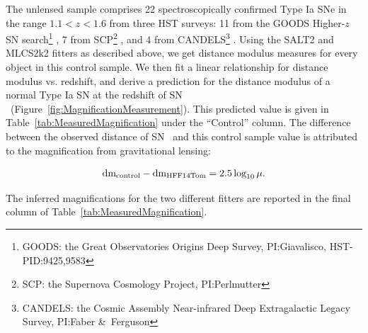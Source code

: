 The unlensed sample comprises 22 spectroscopically confirmed Type Ia
SNe in the range $1.1<z<1.6$ from three HST surveys: 11 from the GOODS Higher-$z$ SN search\footnote{GOODS: the Great Observatories Origins Deep Survey, PI:Giavalisco, HST-PID:9425,9583} \citep{Strolger:2004,Riess:2007}, 7 from SCP\footnote{SCP: the Supernova Cosmology Project, PI:Perlmutter} \citep{Suzuki:2012}, and 4 from CANDELS\footnote{CANDELS: the Cosmic Assembly Near-infrared Deep Extragalactic Legacy Survey, PI:Faber \&\ Ferguson} \citep{Rodney:2012,Rodney:2014}.  Using the SALT2 and MLCS2k2
fitters as described above, we get distance modulus measures for every
object in this control sample.  We then fit a linear relationship for
distance modulus vs. redshift, and derive a prediction for the
distance modulus of a normal Type Ia SN at the redshift of SN \tomas\
(Figure~\ref{fig:MagnificationMeasurement}).
This predicted value is given in
Table~\ref{tab:MeasuredMagnification} under the ``Control'' column.
The difference between the observed distance of SN \tomas\ and this
control sample value is attributed to the magnification from
gravitational lensing:

\begin{equation} \label{eqn:mu}
{\rm dm}_{\rm control} - {\rm dm}_{\rm HFF14Tom} = 2.5 \log_{10}\mu.
\end{equation}

\noindent The inferred magnifications for the two different fitters are
reported in the final column of Table~\ref{tab:MeasuredMagnification}.

